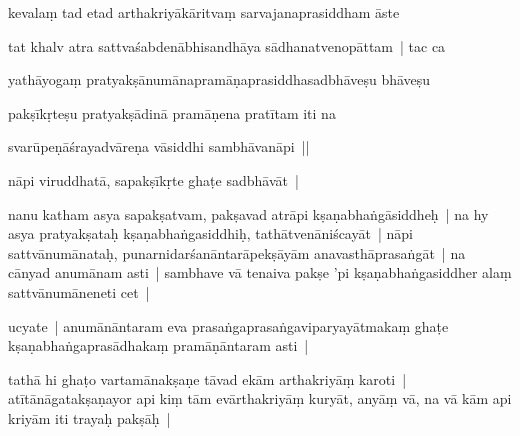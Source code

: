 \documentclass[article,12pt,a4paper]{memoir}%
\newcounter{parCount}
\begin{document}
	  \pstart \leavevmode%
	\label{thakur75-67.15}kevalaṃ tad etad arthakriyākāritvaṃ sarvajanaprasiddham āste
	{}
	\pend%
      

	  \pstart \leavevmode%
	tat khalv atra sattvaśabdenābhisandhāya sādhanatvenopāttam | tac ca
	{}
	\pend%
      

	  \pstart \leavevmode%
	yathāyogaṃ pratyakṣānumānapramāṇaprasiddhasadbhāveṣu bhāveṣu
	{}
	\pend%
      

	  \pstart \leavevmode%
	pakṣīkṛteṣu pratyakṣādinā pramāṇena pratītam iti na
	{}
	\pend%
      

	  \pstart \leavevmode%
	svarūpeṇāśrayadvāreṇa vāsiddhi sambhāvanāpi ||
	{}
	\pend%
      

	  \pstart \leavevmode%
	\label{thakur75-67.20}nāpi viruddhatā, sapakṣīkṛte ghaṭe sadbhāvāt |
	{}
	\pend%
      

	  \pstart \leavevmode%
	\label{thakur75-67.20b}nanu katham asya sapakṣatvam, pakṣavad atrāpi kṣaṇabhaṅgāsiddheḥ | na hy asya pratyakṣataḥ kṣaṇabhaṅgasiddhiḥ, tathātvenāniścayāt | nāpi sattvānumānataḥ, punarnidarśanāntarāpekṣāyām anavasthāprasaṅgāt | na cānyad anumānam asti | sambhave vā tenaiva pakṣe 'pi kṣaṇabhaṅgasiddher alaṃ sattvānumāneneti cet |
	{}
	\pend%
      

	  \pstart \leavevmode%
	\label{thakur75-67.24}ucyate | anumānāntaram eva prasaṅgaprasaṅgaviparyayātmakaṃ ghaṭe kṣaṇabhaṅgaprasādhakaṃ pramāṇāntaram asti |
	{}
	\pend%
      

	  \pstart \leavevmode%
	\label{thakur75-67.25}tathā hi ghaṭo vartamānakṣaṇe tāvad ekām arthakriyāṃ karoti | atītānāgatakṣaṇayor api kiṃ tām evārthakriyāṃ kuryāt, anyāṃ vā, na vā kām api kriyām iti trayaḥ pakṣāḥ |
	{}
	\pend%
      
\end{document}
